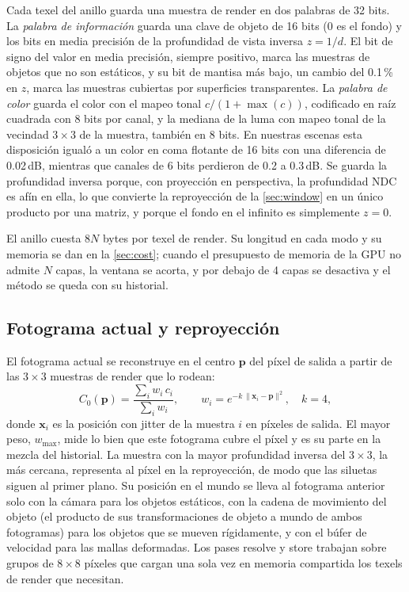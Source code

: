\documentclass[11pt,a4paper]{article}
\newcommand{\vect}[1]{\mathbf{#1}}
\begin{document}
Cada texel del anillo guarda una muestra de render en dos palabras de 32 bits. La \emph{palabra de información} guarda una clave de objeto de 16 bits (0 es el fondo) y los bits en media precisión de la profundidad de vista inversa $z = 1/d$. El bit de signo del valor en media precisión, siempre positivo, marca las muestras de objetos que no son estáticos, y su bit de mantisa más bajo, un cambio del 0.1\,\% en $z$, marca las muestras cubiertas por superficies transparentes. La \emph{palabra de color} guarda el color con el mapeo tonal $c/(1+\max(c))$, codificado en raíz cuadrada con 8 bits por canal, y la mediana de la luma con mapeo tonal de la vecindad $3\times3$ de la muestra, también en 8 bits. En nuestras escenas esta disposición igualó a un color en coma flotante de 16 bits con una diferencia de 0.02\,dB, mientras que canales de 6 bits perdieron de 0.2 a 0.3\,dB. Se guarda la profundidad inversa porque, con proyección en perspectiva, la profundidad NDC es afín en ella, lo que convierte la reproyección de la \cref{sec:window} en un único producto por una matriz, y porque el fondo en el infinito es simplemente $z=0$.

El anillo cuesta $8N$ bytes por texel de render. Su longitud en cada modo y su memoria se dan en la \cref{sec:cost}; cuando el presupuesto de memoria de la GPU no admite $N$ capas, la ventana se acorta, y por debajo de 4 capas se desactiva y el método se queda con su historial.

\subsection{Fotograma actual y reproyección}
\label{sec:current}

El fotograma actual se reconstruye en el centro $\vect p$ del píxel de salida a partir de las $3\times3$ muestras de render que lo rodean:
\begin{equation}
C_0(\vect p) = \frac{\sum_i w_i\, c_i}{\sum_i w_i}, \qquad w_i = e^{-k\,\|\vect x_i - \vect p\|^2}, \quad k = 4,
\label{eq:current}
\end{equation}
donde $\vect x_i$ es la posición con jitter de la muestra $i$ en píxeles de salida. El mayor peso, $w_{\max}$, mide lo bien que este fotograma cubre el píxel y es su parte en la mezcla del historial. La muestra con la mayor profundidad inversa del $3\times3$, la más cercana, representa al píxel en la reproyección, de modo que las siluetas siguen al primer plano. Su posición en el mundo se lleva al fotograma anterior solo con la cámara para los objetos estáticos, con la cadena de movimiento del objeto (el producto de sus transformaciones de objeto a mundo de ambos fotogramas) para los objetos que se mueven rígidamente, y con el búfer de velocidad para las mallas deformadas. Los pases resolve y store trabajan sobre grupos de $8\times8$ píxeles que cargan una sola vez en memoria compartida los texels de render que necesitan.
\end{document}
